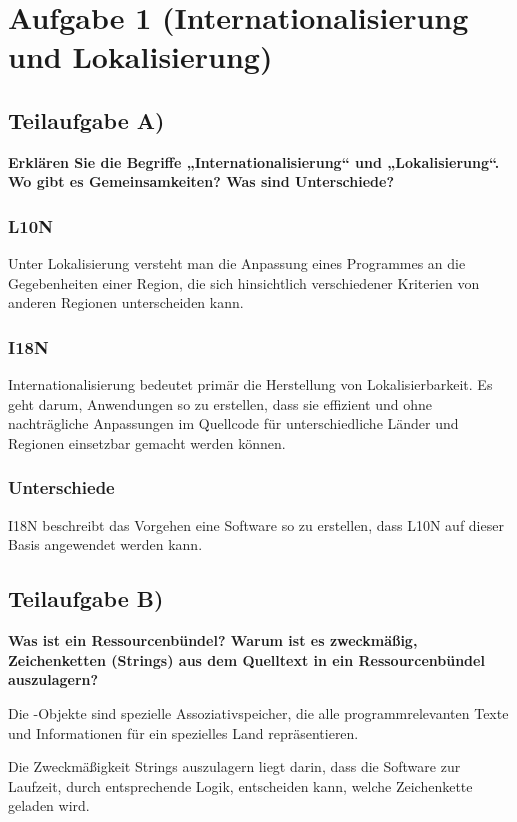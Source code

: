 \section{Aufgabe 1 (Internationalisierung und Lokalisierung)}

\subsection{Teilaufgabe A)}
\textbf{Erklären Sie die Begriffe „Internationalisierung“ und „Lokalisierung“. Wo gibt es
Gemeinsamkeiten? Was sind Unterschiede?}

\subsubsection{L10N}
Unter Lokalisierung versteht man die Anpassung eines Programmes an die
Gegebenheiten einer Region, die sich hinsichtlich verschiedener Kriterien von
anderen Regionen unterscheiden kann.

\subsubsection{I18N}
Internationalisierung bedeutet primär die Herstellung von Lokalisierbarkeit. Es
geht darum, Anwendungen so zu erstellen, dass sie effizient und ohne
nachträgliche Anpassungen im Quellcode für unterschiedliche Länder und Regionen
einsetzbar gemacht werden können.

\subsubsection{Unterschiede}
I18N beschreibt das Vorgehen eine Software so zu erstellen, dass L10N auf dieser
Basis angewendet werden kann.

\subsection{Teilaufgabe B)}
\textbf{Was ist ein Ressourcenbündel? Warum ist es zweckmäßig, Zeichenketten (Strings) aus
dem Quelltext in ein Ressourcenbündel auszulagern?} 
 
Die -Objekte sind spezielle Assoziativspeicher, die alle
programmrelevanten Texte und Informationen für ein spezielles Land
repräsentieren. 

Die Zweckmäßigkeit Strings auszulagern liegt darin, dass die Software zur
Laufzeit, durch entsprechende Logik, entscheiden kann, welche Zeichenkette
geladen wird.

